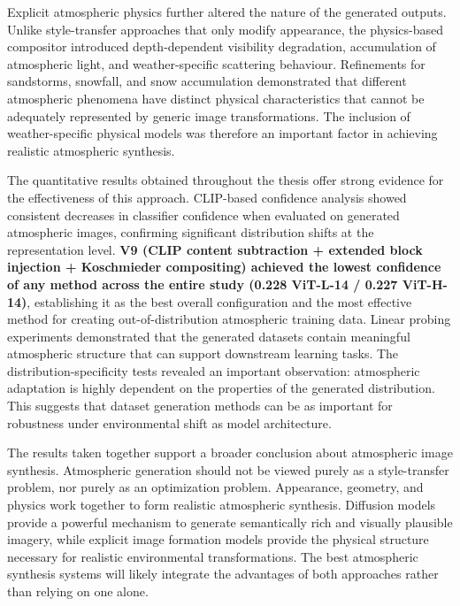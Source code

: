 \noindent Explicit atmospheric physics further altered the nature of the generated outputs. Unlike style-transfer approaches that only modify appearance, the physics-based compositor introduced depth-dependent visibility degradation, accumulation of atmospheric light, and weather-specific scattering behaviour. Refinements for sandstorms, snowfall, and snow accumulation demonstrated that different atmospheric phenomena have distinct physical characteristics that cannot be adequately represented by generic image transformations. The inclusion of weather-specific physical models was therefore an important factor in achieving realistic atmospheric synthesis.

\noindent The quantitative results obtained throughout the thesis offer strong evidence for the effectiveness of this approach. CLIP-based confidence analysis showed consistent decreases in classifier confidence when evaluated on generated atmospheric images, confirming significant distribution shifts at the representation level. \textbf{V9 (CLIP content subtraction + extended block injection + Koschmieder compositing) achieved the lowest confidence of any method across the entire study (0.228 ViT-L-14 / 0.227 ViT-H-14)}, establishing it as the best overall configuration and the most effective method for creating out-of-distribution atmospheric training data. Linear probing experiments demonstrated that the generated datasets contain meaningful atmospheric structure that can support downstream learning tasks. The distribution-specificity tests revealed an important observation: atmospheric adaptation is highly dependent on the properties of the generated distribution. This suggests that dataset generation methods can be as important for robustness under environmental shift as model architecture.

\noindent The results taken together support a broader conclusion about atmospheric image synthesis. Atmospheric generation should not be viewed purely as a style-transfer problem, nor purely as an optimization problem. Appearance, geometry, and physics work together to form realistic atmospheric synthesis. Diffusion models provide a powerful mechanism to generate semantically rich and visually plausible imagery, while explicit image formation models provide the physical structure necessary for realistic environmental transformations. The best atmospheric synthesis systems will likely integrate the advantages of both approaches rather than relying on one alone.

